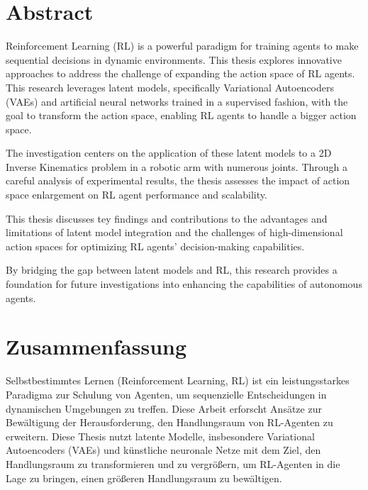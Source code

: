 \chapter*{Abstract}
Reinforcement Learning (RL) is a powerful paradigm for training agents to make sequential decisions in dynamic environments. This thesis explores innovative approaches to address the challenge of expanding the action space of RL agents. This research leverages latent models, specifically Variational Autoencoders (VAEs) and artificial neural networks trained in a supervised fashion, with the goal to transform the action space, enabling RL agents to handle a bigger action space.

The investigation centers on the application of these latent models to a 2D Inverse Kinematics problem in a robotic arm with numerous joints. Through a careful analysis of experimental results, the thesis assesses the impact of action space enlargement on RL agent performance and scalability.

This thesis discusses tey findings and contributions to the advantages and limitations of latent model integration and the challenges of high-dimensional action spaces for optimizing RL agents' decision-making capabilities.


By bridging the gap between latent models and RL, this research provides a foundation for future investigations into enhancing the capabilities of autonomous agents.

\chapter*{Zusammenfassung}

Selbstbestimmtes Lernen (Reinforcement Learning, RL) ist ein leistungsstarkes Paradigma zur Schulung von Agenten, um sequenzielle Entscheidungen in dynamischen Umgebungen zu treffen. Diese Arbeit erforscht Ansätze zur Bewältigung der Herausforderung, den Handlungsraum von RL-Agenten zu erweitern. Diese Thesis nutzt latente Modelle, insbesondere Variational Autoencoders (VAEs) und künstliche neuronale Netze mit dem Ziel, den Handlungsraum zu transformieren und zu vergrößern, um RL-Agenten in die Lage zu bringen, einen größeren Handlungsraum zu bewältigen.

